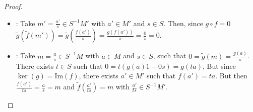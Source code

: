 \begin{problem}
\begin{sol}
\begin{proof}
\begin{itemize}
                \item {}:
                Take $m' = \frac{a'}{s} \in S^{-1}M'$ with $a' \in M'$ and $s \in S$.
                Then, since $g \circ f = 0$ $\tilde{g}(\tilde{f}(m')) = \tilde{g}(\frac{f(a')}{s}) = \frac{g(f(a'))}{s} = \frac{0}{s} = 0$.

                \item {}:
                Take $m = \frac{a}{s} \in S^{-1}M$ with $a \in M$ and $s \in S$, such that ${0 = \tilde{g}(m) = \frac{g(a)}{s}}$.
                There exists $t \in S$ such that $0 = t(g(a) 1 - 0 s) = g(ta)$,
                But since $\ker(g) = \text{Im}(f)$, there exists $a' \in M'$ such that $f(a') = ta$.
                But then $\frac{f(a')}{ts} = \frac{a}{s} = m$ and $\tilde{f}(\frac{a'}{ts}) = m$ with $\frac{a'}{ts} \in S^{-1}M'$.
            \end{itemize}
        \end{proof}
    \end{sol}
\end{problem}